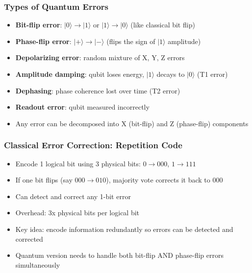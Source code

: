 \begin{frame}[fragile]\frametitle{Types of Quantum Errors}
\begin{itemize}
\item \textbf{Bit-flip error}: $|0\rangle \to |1\rangle$ or $|1\rangle \to |0\rangle$ (like classical bit flip)
\item \textbf{Phase-flip error}: $|+\rangle \to |-\rangle$ (flips the sign of $|1\rangle$ amplitude)
\item \textbf{Depolarizing error}: random mixture of X, Y, Z errors
\item \textbf{Amplitude damping}: qubit loses energy, $|1\rangle$ decays to $|0\rangle$ (T1 error)
\item \textbf{Dephasing}: phase coherence lost over time (T2 error)
\item \textbf{Readout error}: qubit measured incorrectly
\item Any error can be decomposed into X (bit-flip) and Z (phase-flip) components
\end{itemize}
\end{frame}

\begin{frame}[fragile]\frametitle{Classical Error Correction: Repetition Code}
\begin{itemize}
\item Encode 1 logical bit using 3 physical bits: $0 \to 000$, $1 \to 111$
\item If one bit flips (say $000 \to 010$), majority vote corrects it back to $000$
\item Can detect and correct any 1-bit error
\item Overhead: 3x physical bits per logical bit
\item Key idea: encode information redundantly so errors can be detected and corrected
\item Quantum version needs to handle both bit-flip AND phase-flip errors simultaneously
\end{itemize}
\end{frame}

